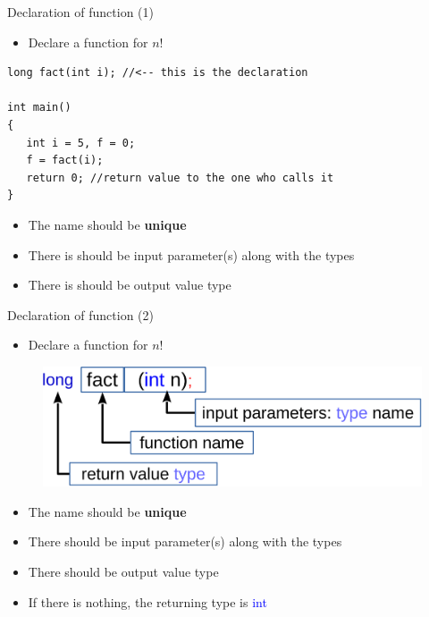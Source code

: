 \begin{frame}[fragile]{Declaration of function (1)}
\begin{itemize}
	\item {Declare a function for $n!$}
\end{itemize}
\begin{lstlisting}
long fact(int i); //<-- this is the declaration

int main()
{
   int i = 5, f = 0;
   f = fact(i);
   return 0; //return value to the one who calls it
}
\end{lstlisting}
\vspace{-0.15in}
\begin{itemize}
	\item {The name should be \textbf{unique}}
	\item {There is should be input parameter(s) along with the types}
	\item {There is should be output value type}
\end{itemize}
\end{frame}


\begin{frame}[fragile]{Declaration of function (2)}
\begin{itemize}
	\item {Declare a function for $n!$}
\end{itemize}
\begin{figure}
	\includegraphics[width=0.8\linewidth]{figs/func_declar.pdf}
\end{figure}
\vspace{-0.15in}
\begin{itemize}
	\item {The name should be \textbf{unique}}
	\item {There should be input parameter(s) along with the types}
	\item {There should be output value type}
	\item {If there is nothing, the returning type is \textcolor{blue}{int}}
\end{itemize}
\end{frame}

